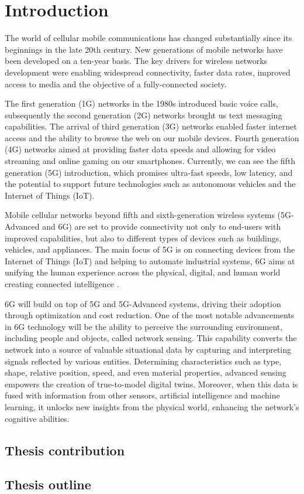 \chapter{Introduction}
\label{chap_intro}

The world of cellular mobile communications has changed substantially since its beginnings in the late 20th century.
New generations of mobile networks have been developed on a ten-year basis. The key drivers for wireless networks development were enabling widespread connectivity, faster data rates, improved access to media and the objective of a fully-connected society.

The first generation (1G) networks in the 1980s introduced basic voice calls, subsequently the second generation (2G) networks brought us text messaging capabilities. The arrival of third generation (3G) networks enabled faster internet access and the ability to browse the web on our mobile devices. 
Fourth generation (4G) networks aimed at providing faster data speeds and allowing for video streaming and online gaming on our smartphones. 
Currently, we can see the fifth generation (5G) introduction, which promises ultra-fast speeds, low latency, and the potential to support future technologies such as autonomous vehicles and the Internet of Things (IoT). 

Mobile cellular networks beyond fifth and sixth-generation wireless systems (5G-Advanced and 6G) are set to provide connectivity not only to end-users with improved capabilities, but also to different types of devices such as buildings, vehicles, and appliances.
The main focus of 5G is on connecting devices from the Internet of Things (IoT) and helping to automate industrial systems, 6G aims at unifying the human experience across the physical, digital, and human world creating connected intelligence \cite{6G-explained-NOKIA}.


6G will build on top of 5G and 5G-Advanced systems, driving their adoption through optimization and cost reduction. 
One of the most notable advancements in 6G technology will be the ability to perceive the surrounding environment, including people and objects, called network sensing. This capability converts the network into a source of valuable situational data by capturing and interpreting signals reflected by various entities. 
Determining characteristics such as type, shape, relative position, speed, and even material properties, advanced sensing empowers the creation of true-to-model digital twins.
Moreover, when this data is fused with information from other sensors, artificial intelligence and machine learning, it unlocks new insights from the physical world, enhancing the network's cognitive abilities.

\section{Thesis contribution}

\section{Thesis outline}
